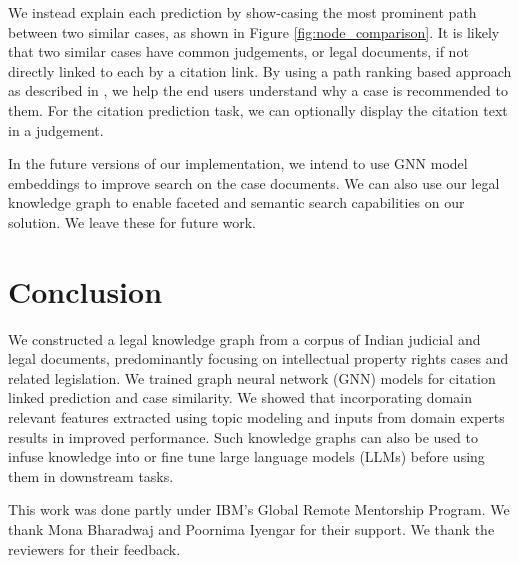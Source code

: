 \documentclass[12pt]{ceurart}
\begin{document}
We instead explain each prediction by show-casing the most prominent path between two similar cases, as shown in Figure \ref{fig:node_comparison}. It is likely that two similar cases have common judgements, or legal documents, if not directly linked to each by a citation link. By using a path ranking based approach as described in \cite{ganesan2020link}, we help the end users understand why a case is recommended to them. For the citation prediction task, we can optionally display the citation text in a judgement.

In the future versions of our implementation, we intend to use GNN model embeddings to improve search on the case documents. We can also use our legal knowledge graph to enable faceted and semantic search capabilities on our solution. We leave these for future work.

\section{Conclusion}
We constructed a legal knowledge graph from a corpus of Indian judicial and legal documents, predominantly focusing on intellectual property rights cases and related legislation. We trained graph neural network (GNN) models for citation linked prediction and case similarity. We showed that incorporating domain relevant features extracted using topic modeling and inputs from domain experts results in improved performance. Such knowledge graphs can also be used to infuse knowledge into or fine tune large language models (LLMs) before using them in downstream tasks.

\begin{acknowledgments}
This work was done partly under IBM's Global Remote Mentorship Program. We thank Mona Bharadwaj and Poornima Iyengar for their support. We thank the reviewers for their feedback.
\end{acknowledgments}






\end{document}
